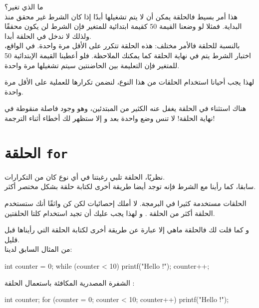 ما الذي تغير؟\\
هذا أمر بسيط فالحلقة 
يمكن أن لا يتم تشغيلها أبدًا إذا كان الشرط غير محقق منذ البداية. فمثلا لو وضعنا القيمة 50 كقيمة ابتدائية للمتغير 
فإن الشرط لن يكون محققًا ولذلك لا ندخل في الحلقة أبدا.\\
بالنسبة للحلقة 
فالأمر مختلف: هذه الحلقة تتكرر على الأقل مرة واحدة. في الواقع، اختبار الشرط يتم في نهاية الحلقة كما يمكنك الملاحظة. فلو أعطينا القيمة الإبتدائية 50 للمتغير 
فإن التعليمة بين الحاضنتين سيتم تشغيلها مرة واحدة. 

لهذا يجب أحيانا استخدام الحلقات من هذا النوع، لنضمن تكرارها للعملية على الأقل مرة واحدة.

\begin{warning}
هناك استثناء في الحلقة 
يغفل عنه الكثير من المبتدئين، وهو وجود فاصلة منقوطة في نهاية الحلقة! لا تنس وضع واحدة بعد 
و إلا ستظهر لك أخطاء أثناء الترجمة!
\end{warning}

\section{الحلقة \texttt{for}}

نظريًا، الحلقة
تلبي رغبتنا في أي نوع كان من التكرارات.\\
سابقا، كما رأينا مع الشرط 
فإنه توجد أيضا  طريقة أخرى لكتابة حلقة بشكل مختصر أكثر.

الحلقات 
مستخدمة كثيرا في البرمجة. لا أملك إحصائيات لكن كن واثقًا أنك ستستخدم الحلقة 
أكثر من الحلقة 
.
و لهذا يجب عليك أن تجيد استخدام كلتا الحلقتين.

و كما قلت لك فالحلقة 
ماهي إلا عبارة عن طريقة أخرى لكتابة الحلقة
التي رأيناها قبل قليل.\\
من المثال السابق لدينا:

\begin{Csource}
int counter = 0;
while (counter < 10)
{
	printf("Hello !\n");
	counter++;
}
\end{Csource}

الشفرة المصدرية المكافئة باستعمال الحلقة
:

\begin{Csource}
int counter;
for (counter = 0; counter < 10; counter++)
{
	printf("Hello !\n");
}
\end{Csource}

